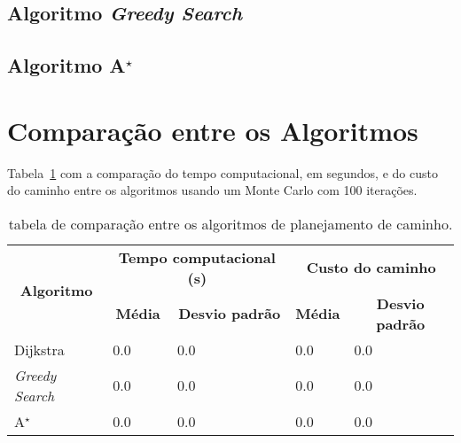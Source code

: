 \documentclass[brazil, 12pt]{article}
\begin{document}
\subsection{Algoritmo \emph{Greedy Search}}

\subsection{Algoritmo A$^{\star}$}



\section{Comparação entre os Algoritmos}

Tabela~\ref{tab:comp} com a comparação do tempo computacional, em segundos, e do custo do caminho entre os algoritmos usando um Monte Carlo com 100 iterações.

\begin{table}[H]
\centering
\caption{tabela de comparação entre os algoritmos de planejamento de caminho.}
\label{tab:comp}
\begin{tabular}{|l|ll|ll|}
\hline
\multicolumn{1}{|c|}{\multirow{2}{*}{\textbf{Algoritmo}}} & \multicolumn{2}{c|}{\textbf{Tempo computacional (s)}}                             & \multicolumn{2}{c|}{\textbf{Custo do caminho}}                                    \\ \cline{2-5} 
\multicolumn{1}{|c|}{}                                    & \multicolumn{1}{c|}{\textbf{Média}} & \multicolumn{1}{c|}{\textbf{Desvio padrão}} & \multicolumn{1}{c|}{\textbf{Média}} & \multicolumn{1}{c|}{\textbf{Desvio padrão}} \\ \hline

Dijkstra                & \multicolumn{1}{l|}{0.0}      & 0.0   & \multicolumn{1}{l|}{0.0}      & 0.0   \\ \hline
\textit{Greedy Search}  & \multicolumn{1}{l|}{0.0}      & 0.0   & \multicolumn{1}{l|}{0.0}      & 0.0   \\ \hline
A$^{\star}$             & \multicolumn{1}{l|}{0.0}      & 0.0   & \multicolumn{1}{l|}{0.0}      & 0.0   \\ \hline
\end{tabular}
\end{table}
\end{document}
